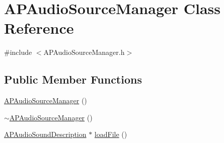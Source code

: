 \hypertarget{class_a_p_audio_source_manager}{\section{A\+P\+Audio\+Source\+Manager Class Reference}
\label{class_a_p_audio_source_manager}
}


{\ttfamily \#include $<$A\+P\+Audio\+Source\+Manager.\+h$>$}

\subsection*{Public Member Functions}
\begin{DoxyCompactItemize}
\item 
\hyperlink{class_a_p_audio_source_manager_a5ebf363c61ac312788b03ed3d9b28ebd}{A\+P\+Audio\+Source\+Manager} ()
\item 
\hyperlink{class_a_p_audio_source_manager_aaebf9a9f1464c65a83b2536b9da195f7}{$\sim$\+A\+P\+Audio\+Source\+Manager} ()
\item 
\hyperlink{class_a_p_audio_sound_description}{A\+P\+Audio\+Sound\+Description} $\ast$ \hyperlink{class_a_p_audio_source_manager_a61a36d6d8f687d2774a896f0612d8d98}{load\+File} ()
\end{DoxyCompactItemize}


